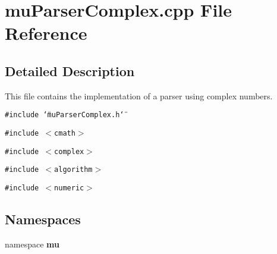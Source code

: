 \section{muParserComplex.cpp File Reference}
\label{muParserComplex_8cpp}


\subsection{Detailed Description}
This file contains the implementation of a parser using complex numbers. 



{\tt \#include \char`\"{}muParserComplex.h\char`\"{}}\par
{\tt \#include $<$cmath$>$}\par
{\tt \#include $<$complex$>$}\par
{\tt \#include $<$algorithm$>$}\par
{\tt \#include $<$numeric$>$}\par
\subsection*{Namespaces}
\begin{CompactItemize}
\item 
namespace {\bf mu}
\end{CompactItemize}
